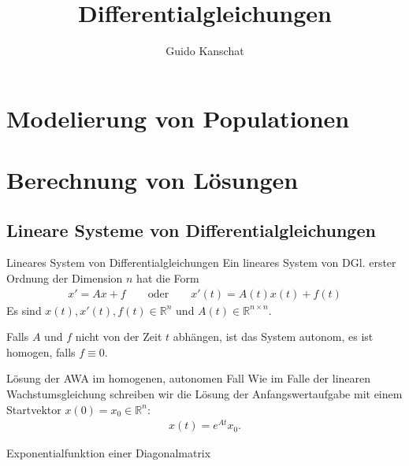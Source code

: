 \documentclass[notheorems,hidelinks,aspectratio=1610]{beamer}
\title{Differentialgleichungen}
\author{Guido Kanschat}
\date{}
\def\R{\mathbb R}
\def\Rnn{\R^{n\times n}}
\begin{document}
\frame{\maketitle}

\section{Modelierung von Populationen}
\frame{\sectoc}



\section{Berechnung von Lösungen}
\frame{\sectoc}

\subsection{Lineare Systeme von Differentialgleichungen}
\frame{\subtoc}

\begin{frame}
  \begin{block}{Lineares System von Differentialgleichungen}
    Ein lineares System von DGl. erster Ordnung der Dimension $n$ hat
    die Form
    \begin{gather*}
      x' = Ax + f
      \qquad\text{oder}\qquad
      x'(t) = A(t)x(t) + f(t)
    \end{gather*}
    Es sind $x(t), x'(t), f(t) \in \R^n$ und $A(t)\in \Rnn$.
    
    Falls $A$ und $f$ nicht von der Zeit $t$ abhängen, ist das System
    autonom, es ist homogen, falls $f\equiv0$.
  \end{block}

  \begin{block}{Lösung der AWA im homogenen, autonomen Fall}
    Wie im Falle der linearen Wachstumsgleichung schreiben wir die
    Lösung der Anfangswertaufgabe mit einem Startvektor $x(0) = x_0\in\R^n$:
    \begin{gather*}
      x(t) = e^{At} x_0.
    \end{gather*}
  \end{block}
\end{frame}

\begin{frame}{Exponentialfunktion einer Diagonalmatrix}
\end{frame}
\end{document}
